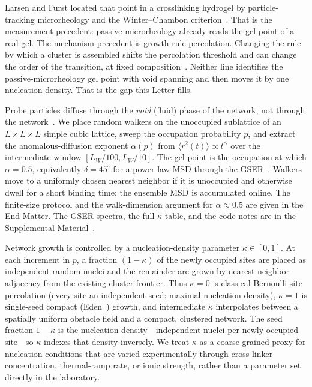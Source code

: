 \documentclass[aps,prl,twocolumn,superscriptaddress,floatfix,nofootinbib,longbibliography]{revtex4-2}
\newcommand{\msd}{\langle r^2(t)\rangle}
\newcommand{\kap}{\kappa}
\begin{document}
Larsen and Furst located that point in a crosslinking hydrogel by particle-tracking microrheology and the Winter--Chambon criterion~\cite{Larsen2008,Corrigan2009}. That is the measurement precedent: passive microrheology already reads the gel point of a real gel. The mechanism precedent is growth-rule percolation. Changing the rule by which a cluster is assembled shifts the percolation threshold and can change the order of the transition, at fixed composition~\cite{Anderson1988,Roy2017,Roy2018,DSouzaNagler2015}. Neither line identifies the passive-microrheology gel point with void spanning and then moves it by one nucleation density. That is the gap this Letter fills.

Probe particles diffuse through the \emph{void} (fluid) phase of the network, not through the network~\cite{deBruyn2013,Rich2011,Oppong2006}. We place random walkers on the unoccupied sublattice of an $L\times L\times L$ simple cubic lattice, sweep the occupation probability $p$, and extract the anomalous-diffusion exponent $\alpha(p)$ from $\msd\propto t^{\alpha}$ over the intermediate window $[L_W/100,L_W/10]$. The gel point is the occupation at which $\alpha=0.5$, equivalently $\delta=45^{\circ}$ for a power-law MSD through the GSER~\cite{Winter1987,Chambon1987,Muthukumar1989}. Walkers move to a uniformly chosen nearest neighbor if it is unoccupied and otherwise dwell for a short binding time; the ensemble MSD is accumulated online. The finite-size protocol and the walk-dimension argument for $\alpha\approx0.5$ are given in the End Matter. The GSER spectra, the full $\kap$ table, and the code notes are in the Supplemental Material~\cite{SM}.

Network growth is controlled by a nucleation-density parameter $\kap\in[0,1]$. At each increment in $p$, a fraction $(1-\kap)$ of the newly occupied sites are placed as independent random nuclei and the remainder are grown by nearest-neighbor adjacency from the existing cluster frontier. Thus $\kap=0$ is classical Bernoulli site percolation (every site an independent seed: maximal nucleation density), $\kap=1$ is single-seed compact (Eden~\cite{Eden1961}) growth, and intermediate $\kap$ interpolates between a spatially uniform obstacle field and a compact, clustered network. The seed fraction $1-\kap$ is the nucleation density---independent nuclei per newly occupied site---so $\kap$ indexes that density inversely. We treat $\kap$ as a coarse-grained proxy for nucleation conditions that are varied experimentally through cross-linker concentration, thermal-ramp rate, or ionic strength, rather than a parameter set directly in the laboratory.
\end{document}
